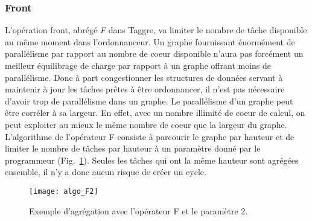 \subsubsection{Front}
L'opération front, abrégé {\em F} dans Taggre, va limiter le nombre de tâche disponible au même moment dans l'ordonnanceur.
%
Un graphe fournissant énormément de parallélisme par rapport au nombre de coeur disponible n'aura pas forcément un meilleur équilibrage de charge par rapport à un graphe offrant moins de parallélisme.
%
Donc à part congestionner les structures de données servant à maintenir à jour les tâches prêtes à être ordonnancer, il n'est pas nécessaire d'avoir trop de parallélisme dans un graphe.
%
Le parallélisme d'un graphe peut être corréler à sa largeur.
%
En effet, avec un nombre illimité de coeur de calcul, on peut exploiter au mieux le même nombre de coeur que la largeur du graphe.
%
L'algorithme de l'opérateur F consiste à parcourir le graphe par hauteur et de limiter le nombre de tâches par hauteur à un paramètre donné par le programmeur (Fig.~\ref{fig:algo_F2}).
%
Seules les tâches qui ont la même hauteur sont agrégées ensemble, il n'y a donc aucun risque de créer un cycle.
\begin{figure}[t!]
  \centering
  \texttt{[image: algo\_F2]}
  \caption{Exemple d'agrégation avec l'opérateur F et le paramètre 2.}
  \label{fig:algo_F2}
\end{figure}
